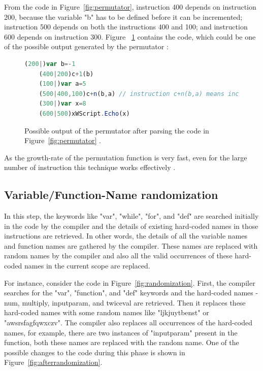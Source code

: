 From the code in Figure~\ref{fig:permutator}, instruction 400 depends on instruction 200, because the variable "b" has to be defined before it can be incremented; instruction 500 depends on both the instructions 400 and 100; and instruction 600 depends on instruction 300. Figure ~\ref{fig:afterpermutator} contains the code, which could be one of the possible output generated by the permutator \cite{bib4}:

\begin{figure}
  \centering
  \begin{lstlisting}[language=JavaScript]
	(200|)var b=-1
	(400|200)c+1(b)
	(100|)var a=5	
	(500|400,100)c+n(b,a) // instruction c+n(b,a) means increasing b by a: i.e. b+=a
	(300|)var x=8
	(600|500)xWScript.Echo(x)
\end{lstlisting}
    \caption[Permutator output]{Possible output of the permutator after parsing the code in Figure~\ref{fig:permutator} \cite{bib4}.}
    \label{fig:afterpermutator}
\end{figure}

As the growth-rate of the permutation function is very fast, even for the large number of instruction this technique works effectively \cite{bib26}.

\subsection{Variable/Function-Name randomization}

In this step, the keywords like "var", "while", "for", and "def" are searched initially in the code by the compiler and the details of existing hard-coded names in those instructions are retrieved. In other words, the details of all the variable names and function names are gathered by the compiler. These names are replaced with random names by the compiler and also all the valid occurrences of these hard-coded names in the current scope are replaced.

For instance, consider the code in Figure~\ref{fig:randomization}. First, the compiler searches for the "var", "function", and "def" keywords and the hard-coded names - num, multiply, inputparam, and twiceval are retrieved. Then it replaces these hard-coded names with some random names like "ljkjuytbenst" or "awsrsfagfqwxczv". The compiler also replaces all occurrences of the hard-coded names, for example, there are two instances of "inputparam" present in the function, both these names are replaced with the random name. One of the possible changes to the code during this phase is shown in Figure~\ref{fig:afterrandomization}. 

